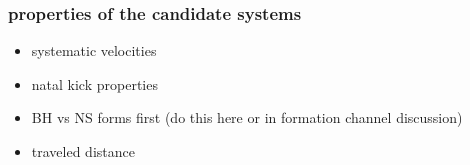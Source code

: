 \documentclass[twocolumn]{aastex63}
\begin{document}
%


\subsubsection{properties of the candidate systems}
\begin{itemize}
	\item systematic velocities
	\item natal kick properties
	\item \ac{BH} vs \ac{NS} forms first  (do this here or in formation channel discussion) 
	\item traveled distance
\end{itemize}
%
%
\end{document}
